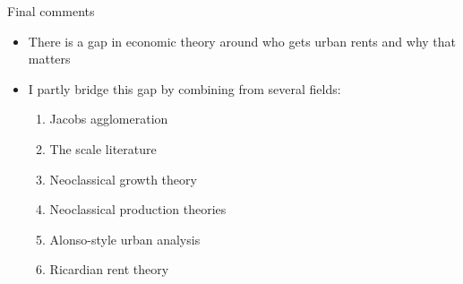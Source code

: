 \documentclass[]{beamer} %
\begin{document}
\begin{frame}{Final comments}
 \begin{itemize} \Large
\item There is a gap in economic theory around who gets urban rents and why that matters
\item I partly bridge this gap by combining from several  fields:

    \begin{enumerate}\item Jacobs agglomeration
    
    \item The scale literature 
    
    \item Neoclassical growth theory
    
    \item Neoclassical production theories
    
    \item Alonso-style urban analysis
    
    \item Ricardian rent theory
    \end{enumerate}
\end{itemize}
\end{frame}
\end{document}
